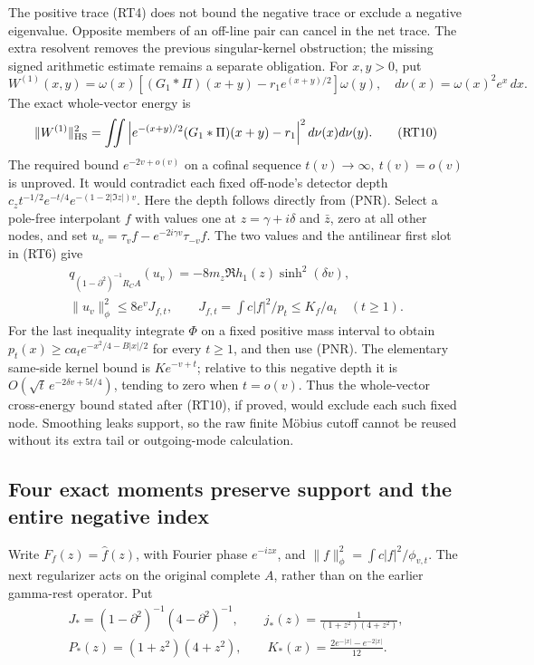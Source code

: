 \documentclass[11pt]{article}
\theoremstyle{remark}\newtheorem{remark}[theorem]{Remark}
\begin{document}
The positive trace (RT4) does not bound the negative trace or
exclude a negative eigenvalue. Opposite members of an off-line
pair can cancel in the net trace. The extra resolvent removes
the previous singular-kernel obstruction; the missing signed
arithmetic estimate remains a separate obligation.
For \(x,y>0\), put
\[
 W^{(1)}(x,y)=\omega(x)
 [(G_1*\Pi)(x+y)-r_1e^{(x+y)/2}]\omega(y),\quad
 d\nu(x)=\omega(x)^2e^x\,dx .
\]
The exact whole-vector energy is
\[
 \|W^{(1)}\|_{\rm HS}^2
 =\iint\left|e^{-(x+y)/2}(G_1*\Pi)(x+y)-r_1\right|^2
                                                    d\nu(x)d\nu(y).
 \tag{RT10}
\]
The required bound \(e^{-2v+o(v)}\) on a cofinal sequence
\(t(v)\to\infty,\ t(v)=o(v)\) is unproved.
It would contradict each fixed off-node's detector depth
\(c_z t^{-1/2}e^{-t/4}e^{-(1-2|\Im z|)v}\).
Here the depth follows directly from (PNR). Select a pole-free
interpolant \(f\) with values one at \(z=\gamma+i\delta\)
and \(\bar z\), zero at all other nodes, and set
\(u_v=\tau_vf-e^{-2i\gamma v}\tau_{-v}f\).
The two values and the antilinear first slot in (RT6) give
\[
 \begin{gathered}
 q_{(1-\partial^2)^{-1}R_CA}(u_v)
       =-8m_z\Re h_1(z)\sinh^2(\delta v),\\
 \|u_v\|_\phi^2\le8e^vJ_{f,t},\qquad
 J_{f,t}=\int c|f|^2/p_t\le K_f/a_t\quad(t\ge1).
 \end{gathered}
\]
For the last inequality integrate \(\Phi\) on a fixed positive
mass interval to obtain
\(p_t(x)\ge c a_t e^{-x^2/4-B|x|/2}\) for every \(t\ge1\),
and then use (PNR). The elementary same-side kernel bound is
\(K e^{-v+t}\); relative to this negative depth it is
\(O(\sqrt t\,e^{-2\delta v+5t/4})\), tending to zero when
\(t=o(v)\). Thus the whole-vector cross-energy bound stated
after (RT10), if proved, would exclude each such fixed node.
Smoothing leaks support, so the raw finite Möbius cutoff cannot
be reused without its extra tail or outgoing-mode calculation.


\subsection{Four exact moments preserve support and the entire negative index}
\label{sec:support-resolvent}

Write \(F_f(z)=\widehat f(z)\), with Fourier phase \(e^{-izx}\),
and \(\|f\|_\phi^2=\int c|f|^2/\phi_{v,t}\).
The next regularizer acts on the original complete \(A\), rather
than on the earlier gamma-rest operator. Put
\[
 \begin{gathered}
 J_*=(1-\partial^2)^{-1}(4-\partial^2)^{-1},\qquad
 j_*(z)=\frac1{(1+z^2)(4+z^2)},\\
 P_*(z)=(1+z^2)(4+z^2),\qquad
 K_*(x)=\frac{2e^{-|x|}-e^{-2|x|}}{12}.
 \end{gathered}                                      \tag{SC1}
\]
\end{document}
